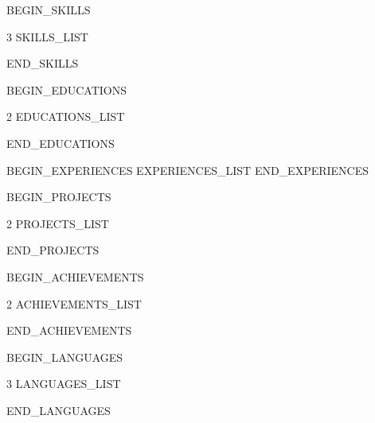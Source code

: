 \documentclass[10pt,a4paper,ragged2e]{maltacv}
\begin{document}


\makecvheader

{{BEGIN_SKILLS}}
\begin{center}
  \begin{multicols}{3} %
    {{SKILLS_LIST}}
  \end{multicols}
\end{center}
{{END_SKILLS}}

{{BEGIN_EDUCATIONS}}
\medskip
\begin{multicols}{2}
  {{EDUCATIONS_LIST}}
\end{multicols}
{{END_EDUCATIONS}}

{{BEGIN_EXPERIENCES}}
\medskip
{}
{{EXPERIENCES_LIST}}
{{END_EXPERIENCES}}

{{BEGIN_PROJECTS}}
\divider
{}
\medskip
\begin{multicols}{2}
  {{PROJECTS_LIST}}
\end{multicols}
{{END_PROJECTS}}

{{BEGIN_ACHIEVEMENTS}}
\medskip
{}
\medskip
\begin{multicols}{2}
  {{ACHIEVEMENTS_LIST}}
\end{multicols}
{{END_ACHIEVEMENTS}}

{{BEGIN_LANGUAGES}}
\medskip
\begin{multicols}{3}
  {{LANGUAGES_LIST}}
\end{multicols}
{{END_LANGUAGES}}
\end{document}
